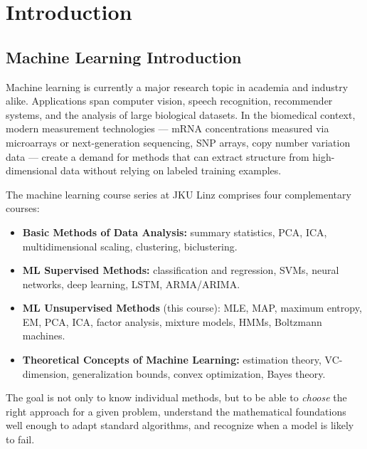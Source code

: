 \documentclass[11pt, oneside]{book}
\begin{document}
\setcounter{tocdepth}{2}

\begingroup
  \let\cleardoublepage\relax
  \let\clearpage\relax
  \tableofcontents
\endgroup

\mainmatter


\chapter{Introduction}

\section{Machine Learning Introduction}

Machine learning is currently a major research topic in academia and industry alike.
Applications span computer vision, speech recognition, recommender systems, and the
analysis of large biological datasets.
In the biomedical context, modern measurement technologies --- mRNA concentrations
measured via microarrays or next-generation sequencing, SNP arrays, copy number
variation data --- create a demand for methods that can extract structure from
high-dimensional data without relying on labeled training examples.

The machine learning course series at JKU Linz comprises four complementary courses:
\begin{itemize}
  \item \textbf{Basic Methods of Data Analysis:} summary statistics, PCA, ICA,
        multidimensional scaling, clustering, biclustering.
  \item \textbf{ML Supervised Methods:} classification and regression, SVMs, neural
        networks, deep learning, LSTM, ARMA/ARIMA.
  \item \textbf{ML Unsupervised Methods} (this course): MLE, MAP, maximum entropy,
        EM, PCA, ICA, factor analysis, mixture models, HMMs, Boltzmann machines.
  \item \textbf{Theoretical Concepts of Machine Learning:} estimation theory,
        VC-dimension, generalization bounds, convex optimization, Bayes theory.
\end{itemize}

The goal is not only to know individual methods, but to be able to \emph{choose}
the right approach for a given problem, understand the mathematical foundations well
enough to adapt standard algorithms, and recognize when a model is likely to fail.
\end{document}
